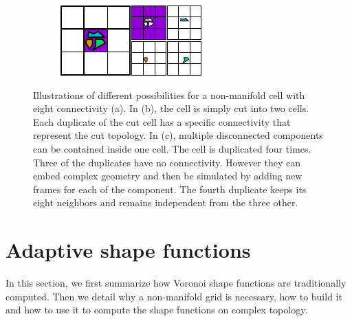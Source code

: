 \documentclass[11pt, oneside, a4paper]{memoir}
\begin{document}
\begin{figure}[!ht]
\hfill
\begin{subfigure}[b]{0.40\linewidth}
\centering
\includegraphics[width=\linewidth]{images/cutting-mig2015/little_pieces.pdf}
\caption{\label{fig:littlePieces}}
\end{subfigure}
\caption{\label{fig:nonmanifoldgridillustration}
Illustrations of different possibilities for a non-manifold cell with eight connectivity (a). In (b), the cell is simply cut into two cells. Each duplicate of the cut cell has a specific connectivity that represent the cut topology. In (c), multiple disconnected components can be contained inside one cell. The cell is duplicated four times. Three of the duplicates have no connectivity. However they can embed complex geometry and then be simulated by adding new frames for each of the component. The fourth duplicate keeps its eight neighbors and remains independent from the three other.}
\end{figure}

\section{Adaptive shape functions} \label{sec:adaptivesf}

In this section, we first summarize how Voronoi shape functions are traditionally computed. Then we detail why a non-manifold grid is necessary, how to build it and how to use it to compute the shape functions on complex topology.

\end{document}
